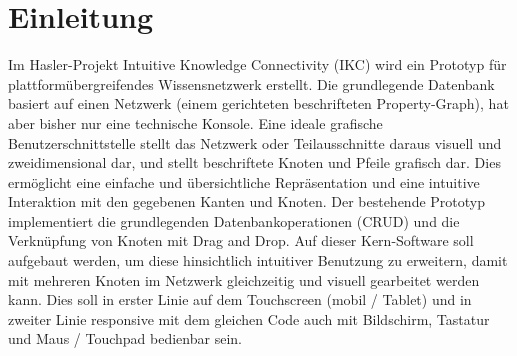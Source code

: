 \chapter{Einleitung}

Im Hasler-Projekt Intuitive Knowledge Connectivity (IKC) wird ein Prototyp für plattformübergreifendes Wissensnetzwerk erstellt. Die grundlegende Datenbank basiert auf einen Netzwerk (einem gerichteten beschrifteten Property-Graph), hat aber bisher nur eine technische Konsole. Eine ideale grafische Benutzerschnittstelle stellt das Netzwerk oder Teilausschnitte daraus visuell und zweidimensional dar, und stellt beschriftete Knoten und Pfeile grafisch dar. Dies ermöglicht eine einfache und übersichtliche Repräsentation und eine intuitive Interaktion mit den gegebenen Kanten und Knoten. Der bestehende Prototyp implementiert die grundlegenden Datenbankoperationen (C\-R\-U\-D) und die Verknüpfung von Knoten mit Drag and Drop. Auf dieser Kern-Software soll aufgebaut werden, um diese hinsichtlich intuitiver Benutzung zu erweitern, damit mit mehreren Knoten im Netzwerk gleichzeitig und visuell gearbeitet werden kann. Dies soll in erster Linie auf dem Touchscreen (mobil / Tablet) und in zweiter Linie responsive mit dem gleichen Code auch mit Bildschirm, Tastatur und Maus / Touchpad bedienbar sein.
